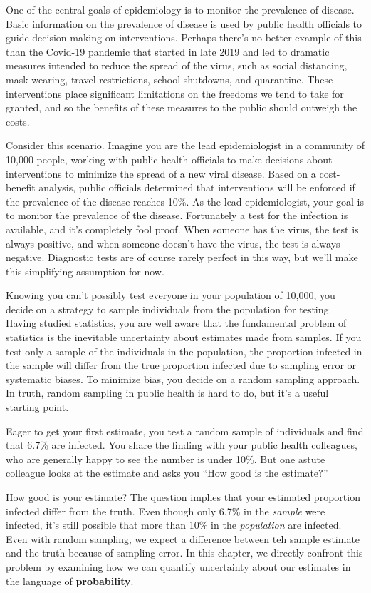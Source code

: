 \documentclass[
]{book}
\begin{document}
One of the central goals of epidemiology is to monitor the prevalence of disease. Basic information on the prevalence of disease is used by public health officials to guide decision-making on interventions. Perhaps there's no better example of this than the Covid-19 pandemic that started in late 2019 and led to dramatic measures intended to reduce the spread of the virus, such as social distancing, mask wearing, travel restrictions, school shutdowns, and quarantine. These interventions place significant limitations on the freedoms we tend to take for granted, and so the benefits of these measures to the public should outweigh the costs.

Consider this scenario. Imagine you are the lead epidemiologist in a community of 10,000 people, working with public health officials to make decisions about interventions to minimize the spread of a new viral disease. Based on a cost-benefit analysis, public officials determined that interventions will be enforced if the prevalence of the disease reaches 10\%. As the lead epidemiologist, your goal is to monitor the prevalence of the disease. Fortunately a test for the infection is available, and it's completely fool proof. When someone has the virus, the test is always positive, and when someone doesn't have the virus, the test is always negative. Diagnostic tests are of course rarely perfect in this way, but we'll make this simplifying assumption for now.

Knowing you can't possibly test everyone in your population of 10,000, you decide on a strategy to sample individuals from the population for testing. Having studied statistics, you are well aware that the fundamental problem of statistics is the inevitable uncertainty about estimates made from samples. If you test only a sample of the individuals in the population, the proportion infected in the sample will differ from the true proportion infected due to sampling error or systematic biases. To minimize bias, you decide on a random sampling approach. In truth, random sampling in public health is hard to do, but it's a useful starting point.

Eager to get your first estimate, you test a random sample of individuals and find that 6.7\% are infected. You share the finding with your public health colleagues, who are generally happy to see the number is under 10\%. But one astute colleague looks at the estimate and asks you ``How good is the estimate?''

How good is your estimate? The question implies that your estimated proportion infected differ from the truth. Even though only 6.7\% in the \emph{sample} were infected, it's still possible that more than 10\% in the \emph{population} are infected. Even with random sampling, we expect a difference between teh sample estimate and the truth because of sampling error. In this chapter, we directly confront this problem by examining how we can quantify uncertainty about our estimates in the language of \textbf{probability}.
\end{document}
